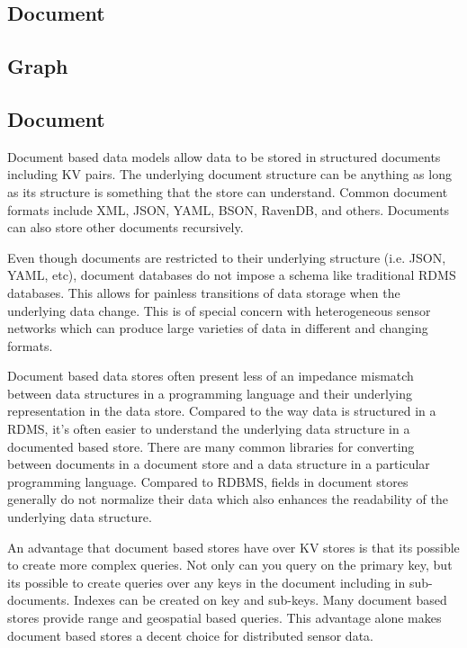 \documentclass[]{article}
\begin{document}
\subsection{Document}

\subsection{Graph}

\subsection{Document}
Document based data models allow data to be stored in structured documents including KV pairs. The underlying document structure can be anything as long as its structure is something that the store can understand. Common document formats include XML, JSON, YAML, BSON, RavenDB, and others\cite{chen_big_2014}. Documents can also store other documents recursively.

Even though documents are restricted to their underlying structure (i.e. JSON, YAML, etc), document databases do not impose a schema like traditional RDMS databases. This allows for painless transitions of data storage when the underlying data change\cite{sharma_extended_2015}.  This is of special concern with heterogeneous sensor networks which can produce large varieties of data in different and changing formats.

Document based data stores often present less of an impedance mismatch between data structures in a programming language and their underlying representation in the data store. Compared to the way data is structured in a RDMS, it's often easier to understand the underlying data structure in a documented based store. There are many common libraries for converting between documents in a document store and a data structure in a particular programming language. Compared to RDBMS, fields in document stores generally do not normalize their data which also enhances the readability of the underlying data structure\cite{ravendb}.

An advantage that document based stores have over KV stores is that its possible to create more complex queries. Not only can you query on the primary key, but its possible to create queries over any keys in the document including in sub-documents. Indexes can be created on key and sub-keys. Many document based stores provide range and geospatial based queries. This advantage alone makes document based stores a decent choice for distributed sensor data.
\end{document}
